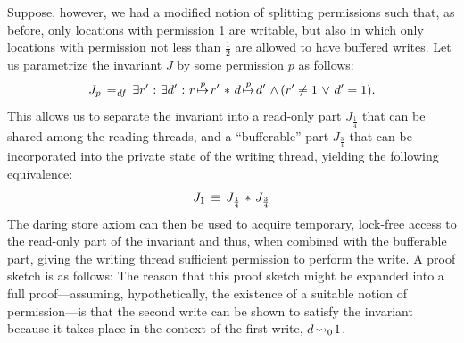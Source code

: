 \documentclass[11pt]{report}
\begin{document}
Suppose, however, we had a modified notion of splitting permissions such that, as before, only locations with permission 1 are writable, but also in which only locations with permission not less than $\frac{1}{2}$ are allowed to have buffered writes. Let us parametrize the invariant $J$ by some permission $p$ as follows: \[ J_p \operatorname{\;=_{\mathit{df}}\;} \exists r' \operatorname{\,:\,} \exists d' \operatorname{\,:\,} r \stackrel{p}{\!\mapsto\!} r' \operatorname{\,\ast\,} d \stackrel{p}{\!\mapsto\!} d' \operatorname{\,\wedge\,} (r' \neq 1 \operatorname{\,\vee\,} d' = 1). \] This allows us to separate the invariant into a read-only part $J_{\frac{1}{4}}$ that can be shared among the reading threads, and a ``bufferable'' part $J_{\frac{3}{4}}$ that can be incorporated into the private state of the writing thread, yielding the following equivalence: \[ J_1 \,\equiv\, J_{\frac{1}{4}} \operatorname{\,\ast\,} J_{\frac{3}{4}}\] The daring store axiom can then be used to acquire temporary, lock-free access to the read-only part of the invariant and thus, when combined with the bufferable part, giving the writing thread sufficient permission to perform the write. A proof sketch is as follows: 
 The reason that this proof sketch might be expanded into a full proof---assuming, hypothetically, the existence of a suitable notion of permission---is that the second write can be shown to satisfy the invariant because it takes place in the context of the first write, $d \!\leadsto_{0}\! 1$. 


\end{document}

